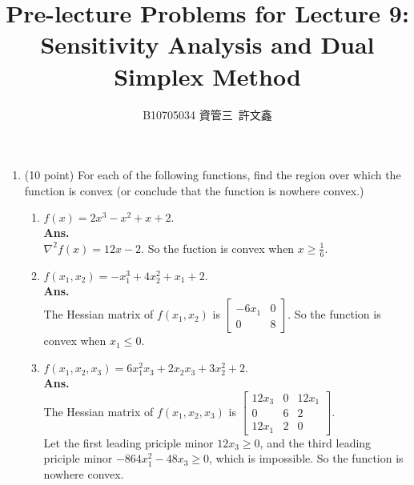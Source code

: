 \documentclass[12pt]{article}
\title{Pre-lecture Problems for Lecture 9:\\ Sensitivity Analysis and Dual Simplex Method}
\author{B10705034 資管三\ 許文鑫}
\begin{document}
\maketitle
      \begin{enumerate}
            \item (10 point) For each of the following functions, find the region over which the function is convex (or
      conclude that the function is nowhere convex.)
      \begin{enumerate}
            \item $f(x) = 2x^3 - x^2 + x + 2.$\\
            \textbf{Ans.}\\
            $\nabla^2f(x) = 12x - 2.$ So the fuction is convex when $x \geq \frac{1}{6}.$ 
            \item $f(x_1,x_2) = -x^3_1 + 4x_2^2 + x_1 + 2.$\\
            \textbf{Ans.}\\   
            The Hessian matrix of $f(x_1,x_2)$ is $\begin{bmatrix}
                  -6x_1 & 0\\
                  0 & 8 
            \end{bmatrix}.$ So the function is convex when $x_1 \leq 0.$
            \item $f(x_1,x_2,x_3) = 6x_1^2x_3 + 2x_2x_3 + 3x_2^2 + 2.$\\
            \textbf{Ans.}\\
            The Hessian matrix of $f(x_1,x_2,x_3)$ is $\begin{bmatrix}
                  12x_3 & 0 & 12x_1\\
                  0 & 6 & 2\\
                  12x_1 & 2 & 0      
            \end{bmatrix}.$\\ 
            Let the first leading priciple minor $12x_3 \geq 0$, and the third leading priciple minor $-864x_1^2 - 48x_3 \geq 0$, which is impossible. So the function is nowhere convex. 
      \end{enumerate}
      \end{enumerate}
\end{document}
